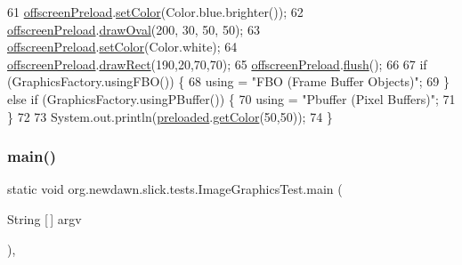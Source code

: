 \begin{DoxyCode}
61         \mbox{\hyperlink{classorg_1_1newdawn_1_1slick_1_1tests_1_1_image_graphics_test_a74912917d74353833cbe845e80cfb3a4}{offscreenPreload}}.\mbox{\hyperlink{classorg_1_1newdawn_1_1slick_1_1_graphics_a725360b8b6c1b50306fe2e8ff4ed44fd}{setColor}}(Color.blue.brighter());
62         \mbox{\hyperlink{classorg_1_1newdawn_1_1slick_1_1tests_1_1_image_graphics_test_a74912917d74353833cbe845e80cfb3a4}{offscreenPreload}}.\mbox{\hyperlink{classorg_1_1newdawn_1_1slick_1_1_graphics_a5418dd30e2cb23a5ce5807561a51f9ee}{drawOval}}(200, 30, 50, 50);
63         \mbox{\hyperlink{classorg_1_1newdawn_1_1slick_1_1tests_1_1_image_graphics_test_a74912917d74353833cbe845e80cfb3a4}{offscreenPreload}}.\mbox{\hyperlink{classorg_1_1newdawn_1_1slick_1_1_graphics_a725360b8b6c1b50306fe2e8ff4ed44fd}{setColor}}(Color.white);
64         \mbox{\hyperlink{classorg_1_1newdawn_1_1slick_1_1tests_1_1_image_graphics_test_a74912917d74353833cbe845e80cfb3a4}{offscreenPreload}}.\mbox{\hyperlink{classorg_1_1newdawn_1_1slick_1_1_graphics_a8ee4ef6a2e90cdd55f376429b7753d52}{drawRect}}(190,20,70,70);
65         \mbox{\hyperlink{classorg_1_1newdawn_1_1slick_1_1tests_1_1_image_graphics_test_a74912917d74353833cbe845e80cfb3a4}{offscreenPreload}}.\mbox{\hyperlink{classorg_1_1newdawn_1_1slick_1_1_graphics_aef2136ee874864cef4886ad15485b79f}{flush}}();
66         
67         \textcolor{keywordflow}{if} (GraphicsFactory.usingFBO()) \{
68             \textcolor{keyword}{using} = \textcolor{stringliteral}{"FBO (Frame Buffer Objects)"};
69         \} \textcolor{keywordflow}{else} \textcolor{keywordflow}{if} (GraphicsFactory.usingPBuffer()) \{
70             \textcolor{keyword}{using} = \textcolor{stringliteral}{"Pbuffer (Pixel Buffers)"};
71         \}
72         
73         System.out.println(\mbox{\hyperlink{classorg_1_1newdawn_1_1slick_1_1tests_1_1_image_graphics_test_a60866f2682da296b8acce663a9234490}{preloaded}}.\mbox{\hyperlink{classorg_1_1newdawn_1_1slick_1_1_image_ab3b87f64ff6c9c413a7f0a016ba0693c}{getColor}}(50,50));
74     \}
\end{DoxyCode}
\mbox{\label{classorg_1_1newdawn_1_1slick_1_1tests_1_1_image_graphics_test_a4ed20df4f9a7280a98bade0cfc7b6171}} 
\subsubsection{\texorpdfstring{main()}{main()}}
{\footnotesize\ttfamily static void org.\+newdawn.\+slick.\+tests.\+Image\+Graphics\+Test.\+main (\begin{DoxyParamCaption}\item[{String \mbox{[}$\,$\mbox{]}}]{argv }\end{DoxyParamCaption})\hspace{0.3cm}{\ttfamily [inline]}, {\ttfamily [static]}}


